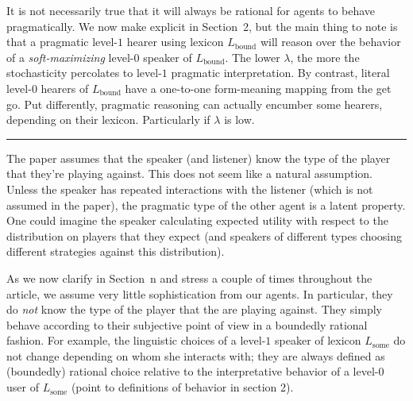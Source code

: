 \documentclass[12pt,a4paper]{article}
\newcommand{\hl}[1]{\textcolor[rgb]{.8,.33,.0}{#1}}%
\begin{document}
It is not necessarily true that it will always be rational for agents to behave pragmatically.  \hl{We now make explicit in Section~2}, but the main thing to note is that a pragmatic level-$1$ hearer using lexicon $L_{\text{bound}}$ will reason over the behavior of a {\em soft-maximizing} level-$0$ speaker of $L_{\text{bound}}$. The lower $\lambda$, the more the stochasticity percolates to level-$1$ pragmatic interpretation. By contrast, literal level-$0$ hearers of $L_{\text{bound}}$ have a one-to-one form-meaning mapping from the get go. Put differently, pragmatic reasoning can actually encumber some hearers, depending on their lexicon. Particularly if $\lambda$ is low.


%
\vspace{0.5cm}

\noindent\rule{\textwidth}{1pt}

\begin{mdframed}[backgroundcolor=gray!25,linecolor=gray!25,frametitle= Reviewer \thereviewerCounter~comment \thereviewerCommentCounter \hfill ~~({\it agent simplicity})]
%
The paper assumes that the speaker (and listener) know the type of the player that they're playing against. This does not seem like a natural assumption. Unless the speaker has repeated interactions with the listener (which is not assumed in the paper), the pragmatic type of the other agent is a latent property. One could imagine the speaker calculating expected utility with respect to the distribution on players that they expect (and speakers of different types choosing different strategies against this distribution). 

%
\end{mdframed}

As we now clarify in \hl{Section~n} and stress a couple of times throughout the article, we assume very little sophistication from our agents. In particular, they do {\em not} know the type of the player that the are playing against. They simply behave according to their subjective point of view in a boundedly rational fashion. For example, the linguistic choices of a level-$1$ speaker of lexicon $L_{\text{some}}$ do not change depending on whom she interacts with; they are always defined as (boundedly) rational choice relative to the interpretative behavior of a level-$0$ user of $L_{\text{some}}$ (\hl{point to definitions of behavior in section 2}).
%

\vspace{0.5cm}
\end{document}
